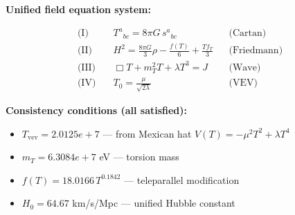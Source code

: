 
\textbf{Unified field equation system:}

\begin{align}
  \text{(I)} \quad & T^a{}_{bc} = 8\pi G \, s^a{}_{bc} && \text{(Cartan)} \\
  \text{(II)} \quad & H^2 = \frac{8\pi G}{3}\rho - \frac{f(T)}{6} + \frac{Tf_T}{3} && \text{(Friedmann)} \\
  \text{(III)} \quad & \Box T + m_T^2 T + \lambda T^3 = J && \text{(Wave)} \\
  \text{(IV)} \quad & T_0 = \frac{\mu}{\sqrt{2\lambda}} && \text{(VEV)}
\end{align}

\textbf{Consistency conditions (all satisfied):}
\begin{itemize}
  \item $T_{\text{vev}} = 2.0125e+7$ — from Mexican hat $V(T) = -\mu^2 T^2 + \lambda T^4$
  \item $m_T = 6.3084e+7$ eV — torsion mass
  \item $f(T) = 18.0166 \, T^{0.1842}$ — teleparallel modification
  \item $H_0 = 64.67$ km/s/Mpc — unified Hubble constant
\end{itemize}